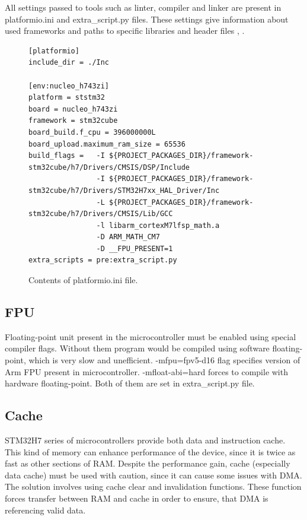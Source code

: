 \documentclass[a4paper,twoside,12pt]{book}
\begin{document}
All settings passed to tools such as linter, compiler and linker
are present in platformio.ini and extra\_script.py files.
These settings give information about used frameworks
and paths to specific libraries and header files
\cite{platformio},
\cite{gcc}.

\begin{figure}[H]
\centering
\begin{lstlisting}
[platformio]
include_dir = ./Inc

[env:nucleo_h743zi]
platform = ststm32
board = nucleo_h743zi
framework = stm32cube
board_build.f_cpu = 396000000L
board_upload.maximum_ram_size = 65536
build_flags =   -I ${PROJECT_PACKAGES_DIR}/framework-stm32cube/h7/Drivers/CMSIS/DSP/Include
                -I ${PROJECT_PACKAGES_DIR}/framework-stm32cube/h7/Drivers/STM32H7xx_HAL_Driver/Inc
                -L ${PROJECT_PACKAGES_DIR}/framework-stm32cube/h7/Drivers/CMSIS/Lib/GCC
                -l libarm_cortexM7lfsp_math.a
                -D ARM_MATH_CM7
                -D __FPU_PRESENT=1
extra_scripts = pre:extra_script.py
\end{lstlisting}
\caption{Contents of platformio.ini file.}
\label{fig:ini}
\end{figure}

\subsection{FPU}

Floating-point unit present in the microcontroller must be enabled
using special compiler flags. Without them program would be compiled
using software floating-point, which is very slow and unefficient.
-mfpu=fpv5-d16 flag specifies version of Arm FPU present in microcontroller.
-mfloat-abi=hard forces to compile with hardware floating-point.
Both of them are set in extra\_script.py file.

\subsection{Cache}

STM32H7 series of microcontrollers provide both data and instruction cache.
This kind of memory can enhance performance of the device,
since it is twice as fast as other sections of RAM.
Despite the performance gain, cache (especially data cache)
must be used with caution, since it can cause some issues with DMA.
\cite{dma}
The solution involves using cache clear and invalidation functions.
These function forces transfer between RAM and cache in order to ensure,
that DMA is referencing valid data.
\end{document}
